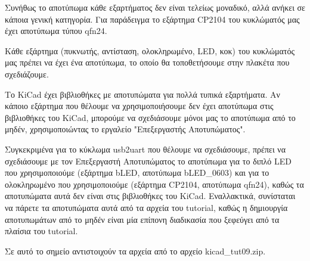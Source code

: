 \documentclass[a4paper]{article}
\begin{document}
Συνήθως το αποτύπωμα κάθε εξαρτήματος δεν είναι τελείως μοναδικό, αλλά ανήκει σε κάποια γενική κατηγορία. Για παράδειγμα το εξάρτημα \textenglish{CP2104} του κυκλώματός μας έχει αποτύπωμα τύπου qfn24.

Κάθε εξάρτημα (πυκνωτής, αντίσταση, ολοκληρωμένο, \textenglish{LED}, κοκ) του κυκλώματός μας πρέπει να έχει ένα αποτύπωμα, το οποίο θα τοποθετήσουμε στην πλακέτα που σχεδιάζουμε.

\begin{figure}
  \begin{center}
    \label{fig:kicad-main}
  \end{center}
\end{figure}

Το \textenglish{KiCad} έχει βιβλιοθήκες με αποτυπώματα για πολλά τυπικά εξαρτήματα. Αν κάποιο εξάρτημα που θέλουμε να χρησιμοποιήσουμε δεν έχει αποτύπωμα στις βιβλιοθήκες του \textenglish{KiCad}, μπορούμε να σχεδιάσουμε μόνοι μας το αποτύπωμα από το μηδέν, χρησιμοποιώντας το εργαλείο "Επεξεργαστής Αποτυπώματος".

Συγκεκριμένα για το κύκλωμα usb2uart που θέλουμε να σχεδιάσουμε, πρέπει να σχεδιάσουμε με τον Επεξεργαστή Αποτυπώματος το αποτύπωμα για το διπλό \textenglish{LED} που χρησιμοποιούμε (εξάρτημα b\textenglish{LED}, αποτύπωμα b\textenglish{LED}\_0603) και για το ολοκληρωμένο που χρησιμοποιούμε (εξάρτημα \textenglish{CP2104}, αποτύπωμα qfn24), καθώς τα αποτυπώματα αυτά δεν είναι στις βιβλιοθήκες του \textenglish{KiCad}. Εναλλακτικά, συνίσταται να πάρετε τα αποτυπώματα αυτά από τα αρχεία του tutorial, καθώς η δημιουργία αποτυπωμάτων από το μηδέν είναι μία επίπονη διαδικασία που ξεφεύγει από τα πλαίσια του tutorial.

Σε αυτό το σημείο αντιστοιχούν τα αρχεία από το αρχείο kicad\_tut09.zip.
\end{document}
